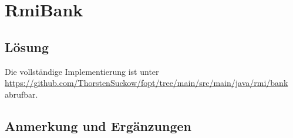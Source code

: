 \section{RmiBank}\label{ch:rmibank}


\subsection{Lösung}

Die vollständige Implementierung ist unter \url{https://github.com/ThorstenSuckow/fopt/tree/main/src/main/java/rmi/bank} abrufbar.

\subsection{Anmerkung und Ergänzungen}

